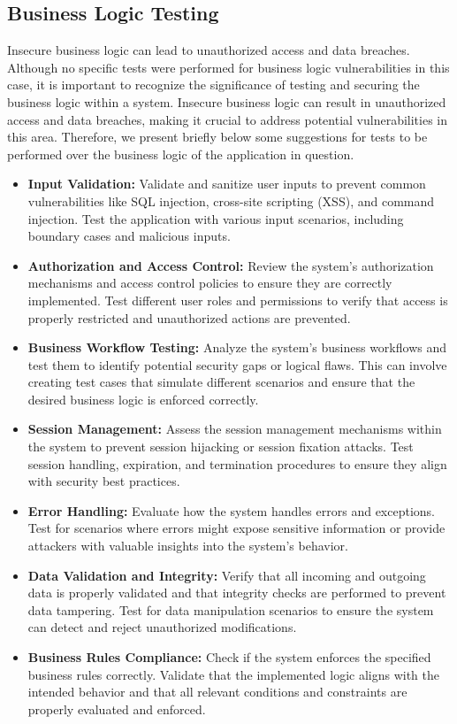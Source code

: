 \documentclass[12pt]{article}
\begin{document}
\subsection{Business Logic Testing}
 Insecure business logic can lead to unauthorized access and data breaches. Although no specific tests were performed for business logic vulnerabilities in this case, it is important to recognize the significance of testing and securing the business logic within a system. Insecure business logic can result in unauthorized access and data breaches, making it crucial to address potential vulnerabilities in this area. Therefore, we present briefly below some suggestions for tests to be performed over the business logic of the application in question.

\begin{itemize}
  \item \textbf{Input Validation:} Validate and sanitize user inputs to prevent common vulnerabilities like SQL injection, cross-site scripting (XSS), and command injection. Test the application with various input scenarios, including boundary cases and malicious inputs.
  
  \item \textbf{Authorization and Access Control:} Review the system's authorization mechanisms and access control policies to ensure they are correctly implemented. Test different user roles and permissions to verify that access is properly restricted and unauthorized actions are prevented.
  
  \item \textbf{Business Workflow Testing:} Analyze the system's business workflows and test them to identify potential security gaps or logical flaws. This can involve creating test cases that simulate different scenarios and ensure that the desired business logic is enforced correctly.
  
  \item \textbf{Session Management:} Assess the session management mechanisms within the system to prevent session hijacking or session fixation attacks. Test session handling, expiration, and termination procedures to ensure they align with security best practices.
  
  \item \textbf{Error Handling:} Evaluate how the system handles errors and exceptions. Test for scenarios where errors might expose sensitive information or provide attackers with valuable insights into the system's behavior.
  
  \item \textbf{Data Validation and Integrity:} Verify that all incoming and outgoing data is properly validated and that integrity checks are performed to prevent data tampering. Test for data manipulation scenarios to ensure the system can detect and reject unauthorized modifications.
  
  \item \textbf{Business Rules Compliance:} Check if the system enforces the specified business rules correctly. Validate that the implemented logic aligns with the intended behavior and that all relevant conditions and constraints are properly evaluated and enforced.
\end{itemize}
\end{document}
